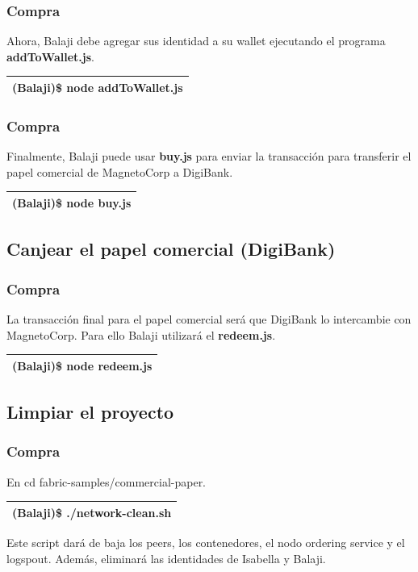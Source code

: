 \documentclass{beamer}
\begin{document}
	\begin{frame}
		\frametitle{Compra}
		Ahora, Balaji debe agregar sus identidad a su wallet ejecutando el programa \textbf{addToWallet.js}.\\
		\begin{center}
			\begin{tabulary}{\linewidth}{L}
				\hline
				(Balaji)\$ node addToWallet.js \\
				\hline
			\end{tabulary} 
		\end{center}
	\end{frame}
	
	\begin{frame}
		\frametitle{Compra}
		Finalmente, Balaji puede usar \textbf{buy.js} para enviar la transacción para transferir el papel comercial de MagnetoCorp a DigiBank.\\
		\begin{center}
			\begin{tabulary}{\linewidth}{L}
				\hline
				(Balaji)\$ node buy.js \\
				\hline
			\end{tabulary} 
		\end{center}
	\end{frame}
	
	\subsection{Canjear el papel comercial (DigiBank)}
	
	\begin{frame}
		\frametitle{Compra}
		La transacción final para el papel comercial será que DigiBank lo intercambie con MagnetoCorp. Para ello Balaji utilizará el \textbf{redeem.js}.\\
		\begin{center}
			\begin{tabulary}{\linewidth}{L}
				\hline
				(Balaji)\$ node redeem.js \\
				\hline
			\end{tabulary} 
		\end{center}
	\end{frame}
	
	\subsection{Limpiar el proyecto}
	
	\begin{frame}
		\frametitle{Compra}
		En cd fabric-samples/commercial-paper.\\
		\begin{center}
			\begin{tabulary}{\linewidth}{L}
				\hline
				(Balaji)\$ ./network-clean.sh \\
				\hline
			\end{tabulary} 
		\end{center}
		Este script dará de baja los peers, los contenedores, el nodo ordering service y el logspout. Además, eliminará las identidades de Isabella y Balaji.
	\end{frame}
	
\end{document}
